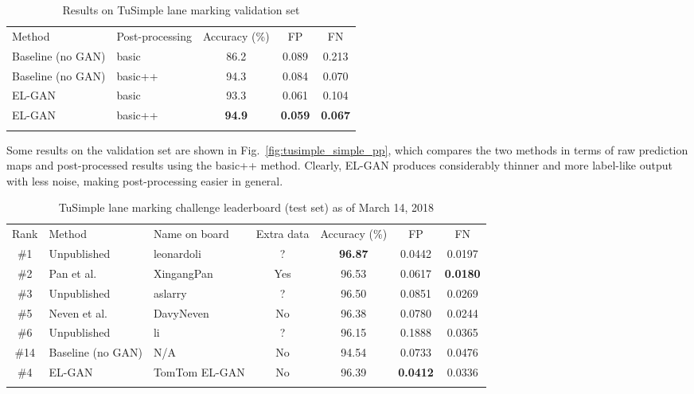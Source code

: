 \documentclass{article} \usepackage{nips13submit_e,times}
\newcommand{\elgan}{\mbox{EL-GAN}}
\begin{document}
\setlength{\tabcolsep}{4pt}
\begin{table}
\begin{center}
    \caption{Results on TuSimple lane marking validation set}
    \label{table:tusimple_simple_pp}
    \begin{tabular}{ll|ccc}
      \hline\noalign{\smallskip}
      Method & Post-processing & Accuracy (\%) & FP & FN \\
      \noalign{\smallskip}\hline\noalign{\smallskip}
      Baseline (no GAN) & basic & 86.2 & 0.089 & 0.213 \\
      Baseline (no GAN) & basic++ & 94.3 & 0.084 & 0.070 \\
      \elgan{} & basic & 93.3 & 0.061 & 0.104 \\
      \elgan{} & basic++ & \textbf{94.9} & \textbf{0.059} & \textbf{0.067} \\
      \noalign{\smallskip}\hline
    \end{tabular}
  \end{center}
\end{table}
\setlength{\tabcolsep}{1.4pt}

Some results on the validation set are shown in Fig.~\ref{fig:tusimple_simple_pp}, which compares the two methods in terms of raw prediction maps and post-processed results using the basic++ method.
Clearly, \elgan{} produces considerably thinner and more label-like output with less noise, making post-processing easier in general.

\setlength{\tabcolsep}{4pt}
\begin{table}[ht]
\begin{center}
    \caption{TuSimple lane marking challenge leaderboard (test set) as of March 14, 2018}
    \label{table:tusimple_simple_leaderboard}
    \begin{tabular}{c|llc|ccc}
      \hline\noalign{\smallskip}
      Rank & Method & Name on board & Extra data & Accuracy (\%) & FP & FN\\
      \noalign{\smallskip}\hline\noalign{\smallskip}
      \#1 & Unpublished & leonardoli & ? &\textbf{96.87} & 0.0442 & 0.0197 \\
      \#2 & Pan et al.~\cite{pan2017spatial} & XingangPan & Yes & 96.53 & 0.0617 & \textbf{0.0180} \\
      \#3 & Unpublished & aslarry & ? & 96.50 & 0.0851 & 0.0269 \\
      \#5 & Neven et al.~\cite{neven2018towards} & DavyNeven & No & 96.38 & 0.0780 & 0.0244 \\
      \#6 & Unpublished & li & ? & 96.15 & 0.1888 & 0.0365 \\
      \noalign{\smallskip}\hline\noalign{\smallskip}
      \#14 & Baseline (no GAN) & N/A  & No & 94.54 & 0.0733 & 0.0476 \\
      \#4 & \elgan{} & TomTom \elgan{} & No & 96.39 & \textbf{0.0412} & 0.0336 \\
      \noalign{\smallskip}\hline
    \end{tabular}
  \end{center}
\end{table}
\setlength{\tabcolsep}{1.4pt}
\end{document}
